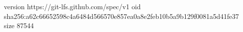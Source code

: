 version https://git-lfs.github.com/spec/v1
oid sha256:a62c66652598c4a6484d566570e857ea0a8e2feb10b5a9b129f0081a5d41fe37
size 87544
